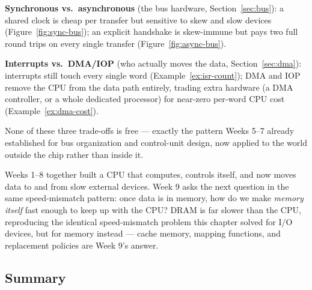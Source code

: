 \documentclass[11pt]{article}
\begin{document}
\textbf{Synchronous vs.\ asynchronous} (the bus hardware, Section~\ref{sec:bus}): a shared clock is cheap per transfer but sensitive to skew and slow devices (Figure~\ref{fig:sync-bus}); an explicit handshake is skew-immune but pays two full round trips on every single transfer (Figure~\ref{fig:async-bus}).

\textbf{Interrupts vs.\ DMA/IOP} (who actually moves the data, Section~\ref{sec:dma}): interrupts still touch every single word (Example~\ref{ex:isr-count}); DMA and IOP remove the CPU from the data path entirely, trading extra hardware (a DMA controller, or a whole dedicated processor) for near-zero per-word CPU cost (Example~\ref{ex:dma-cost}).

None of these three trade-offs is free --- exactly the pattern Weeks 5--7 already established for bus organization and control-unit design, now applied to the world outside the chip rather than inside it.

Weeks 1--8 together built a CPU that computes, controls itself, and now moves data to and from slow external devices. Week 9 asks the next question in the same speed-mismatch pattern: once data is in memory, how do we make \emph{memory itself} fast enough to keep up with the CPU? DRAM is far slower than the CPU, reproducing the identical speed-mismatch problem this chapter solved for I/O devices, but for memory instead --- cache memory, mapping functions, and replacement policies are Week 9's answer.

\subsection{Summary}
\end{document}
